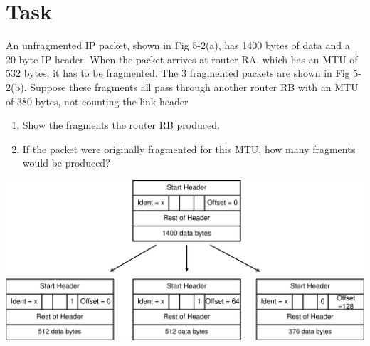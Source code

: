 \documentclass[11pt]{article}
\begin{document}
%
%


    \setcounter{section}{3}


    \section{Task}\label{sec:task-4}
    An unfragmented IP packet, shown in Fig 5-2(a), has 1400 bytes of data and a 20-byte IP header.
    When the packet arrives at router RA, which has an MTU of 532 bytes, it has to be fragmented.
    The 3 fragmented packets are shown in Fig 5-2(b).
    Suppose these fragments all pass through another router RB with an MTU of 380 bytes, not counting the link header
    \begin{enumerate}
        \item Show the fragments the router RB produced.
        \item If the packet were originally fragmented for this MTU, how many fragments would be produced?
    \end{enumerate}

    \begin{center}
        \includegraphics[width=1\textwidth]{figs/Task4}
    \end{center}
\end{document}
